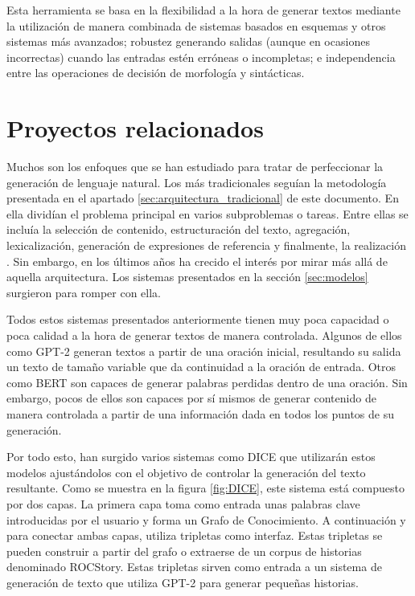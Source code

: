 Esta herramienta se basa en la flexibilidad a la hora de generar textos mediante la utilización de manera combinada de sistemas basados en esquemas y otros sistemas más avanzados; robustez generando salidas (aunque en ocasiones incorrectas) cuando las entradas estén erróneas o incompletas; e independencia entre las operaciones de decisión de morfología y sintácticas.

\section{Proyectos relacionados}
Muchos son los enfoques que se han estudiado para tratar de perfeccionar la generación de lenguaje natural. Los más tradicionales seguían la metodología presentada en el apartado \ref{sec:arquitectura_tradicional} de este documento. En ella dividían el problema principal en varios subproblemas o tareas. Entre ellas se incluía la selección de contenido, estructuración del texto, agregación, lexicalización, generación de expresiones de referencia y finalmente, la realización \citep{reiter1997building}. Sin embargo, en los últimos años ha crecido el interés por mirar más allá de aquella arquitectura. Los sistemas presentados en la sección \ref{sec:modelos} surgieron para romper con ella.

Todos estos sistemas presentados anteriormente tienen muy poca capacidad o poca calidad a la hora de generar textos de manera controlada. Algunos de ellos como GPT-2 generan textos a partir de una oración inicial, resultando su salida un texto de tamaño variable que da continuidad a la oración de entrada. Otros como BERT son capaces de generar palabras perdidas dentro de una oración. Sin embargo, pocos de ellos son capaces por sí mismos de generar contenido de manera controlada a partir de una información dada en todos los puntos de su generación.


Por todo esto, han surgido varios sistemas como DICE \citep{yang2020creative} que utilizarán estos modelos ajustándolos con el objetivo de controlar la generación del texto resultante. Como se muestra en la figura \ref{fig:DICE}, este sistema está compuesto por dos capas. La primera capa toma como entrada unas palabras clave introducidas por el usuario y forma un Grafo de Conocimiento. A continuación y para conectar ambas capas, utiliza tripletas como interfaz. Estas tripletas se pueden construir a partir del grafo o extraerse de un corpus de historias denominado ROCStory. Estas tripletas sirven como entrada a un sistema de generación de texto que utiliza GPT-2 para generar pequeñas historias.

